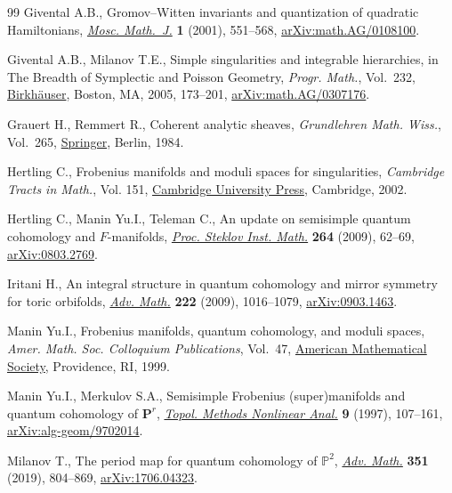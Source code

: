 \documentclass[10pt,a4paper]{article}
\numberwithin{equation}{section}
\begin{document}
\begin{thebibliography}{99}
Givental A.B., Gromov--{W}itten invariants and quantization of quadratic
 {H}amiltonians, \href{https://doi.org/10.17323/1609-4514-2001-1-4-551-568}{\textit{Mosc. Math.~J.}} \textbf{1} (2001), 551--568,
 \href{https://arxiv.org/abs/math.AG/0108100}{arXiv:math.AG/0108100}.

Givental A.B., Milanov T.E., Simple singularities and integrable hierarchies,
 in The {B}readth of {S}ymplectic and {P}oisson {G}eometry, \textit{Progr.
 Math.}, Vol.~232, \href{https://doi.org/10.1007/0-8176-4419-9_7}{Birkh\"auser}, Boston, MA, 2005, 173--201,
 \href{https://arxiv.org/abs/math.AG/0307176}{arXiv:math.AG/0307176}.

Grauert H., Remmert R., Coherent analytic sheaves, \textit{Grundlehren Math.
 Wiss.}, Vol.~265, \href{https://doi.org/10.1007/978-3-642-69582-7}{Springer}, Berlin, 1984.

Hertling C., Frobenius manifolds and moduli spaces for singularities,
 \textit{Cambridge Tracts in Math.}, Vol. 151, \href{https://doi.org/10.1017/CBO9780511543104}{Cambridge University Press},
 Cambridge, 2002.

Hertling C., Manin Yu.I., Teleman C., An update on semisimple quantum cohomology
 and {$F$}-manifolds, \href{https://doi.org/10.1134/S0081543809010088}{\textit{Proc. Steklov Inst. Math.}} \textbf{264} (2009),
 62--69, \href{https://arxiv.org/abs/0803.2769}{arXiv:0803.2769}.

Iritani H., An integral structure in quantum cohomology and mirror symmetry for
 toric orbifolds, \href{https://doi.org/10.1016/j.aim.2009.05.016}{\textit{Adv. Math.}} \textbf{222} (2009), 1016--1079,
 \href{https://arxiv.org/abs/0903.1463}{arXiv:0903.1463}.

Manin Yu.I., Frobenius manifolds, quantum cohomology, and moduli spaces,
 \textit{Amer. Math. Soc. Colloquium Publications}, Vol.~47, \href{https://doi.org/10.1090/coll/047}{American
 Mathematical Society}, Providence, RI, 1999.

Manin Yu.I., Merkulov S.A., Semisimple {F}robenius (super)manifolds and quantum
 cohomology of {${\mathbf P}^r$}, \href{https://doi.org/10.12775/TMNA.1997.006}{\textit{Topol. Methods Nonlinear Anal.}}
 \textbf{9} (1997), 107--161, \href{https://arxiv.org/abs/alg-geom/9702014}{arXiv:alg-geom/9702014}.

Milanov T., The period map for quantum cohomology of {$\mathbb{P}^2$},
 \href{https://doi.org/10.1016/j.aim.2019.05.011}{\textit{Adv. Math.}} \textbf{351} (2019), 804--869, \href{https://arxiv.org/abs/1706.04323}{arXiv:1706.04323}.


\end{thebibliography}
\end{document}
